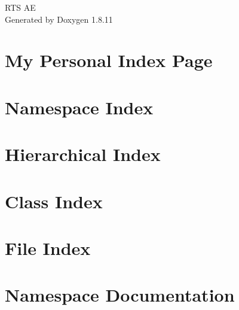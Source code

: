 \documentclass[twoside]{book}
\newcommand{\+}{\discretionary{\mbox{\scriptsize$\hookleftarrow$}}{}{}}
\newcommand{\clearemptydoublepage}{%
  \newpage{\pagestyle{empty}\cleardoublepage}%
}
\begin{document}
\hypersetup{pageanchor=false,
             bookmarksnumbered=true,
             pdfencoding=unicode
            }
\begin{titlepage}
\vspace*{7cm}
\begin{center}%
{\Large R\+TS AE }\\
\vspace*{1cm}
{\large Generated by Doxygen 1.8.11}\\
\end{center}
\end{titlepage}
\clearemptydoublepage
\tableofcontents
\clearemptydoublepage
{}
\hypersetup{pageanchor=true}

\chapter{My Personal Index Page}
\label{index}\hypertarget{index}{}
\chapter{Namespace Index}

\chapter{Hierarchical Index}

\chapter{Class Index}

\chapter{File Index}

\chapter{Namespace Documentation}

\end{document}

